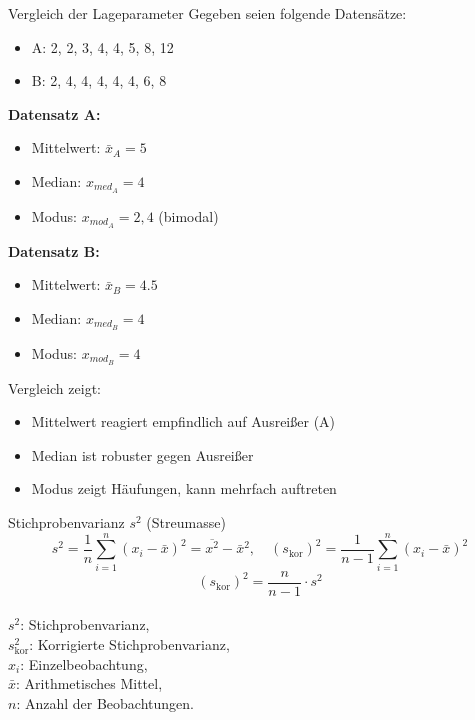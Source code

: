 \begin{example2}{Vergleich der Lageparameter}
Gegeben seien folgende Datensätze:
\begin{itemize}
    \item A: 2, 2, 3, 4, 4, 5, 8, 12
    \item B: 2, 4, 4, 4, 4, 4, 6, 8
\end{itemize}

\textbf{Datensatz A:}
\begin{itemize}
    \item Mittelwert: $\bar{x}_A = 5$
    \item Median: $x_{med_A} = 4$
    \item Modus: $x_{mod_A} = 2, 4$ (bimodal)
\end{itemize}

\textbf{Datensatz B:}
\begin{itemize}
    \item Mittelwert: $\bar{x}_B = 4.5$
    \item Median: $x_{med_B} = 4$
    \item Modus: $x_{mod_B} = 4$
\end{itemize}

Vergleich zeigt:
\begin{itemize}
    \item Mittelwert reagiert empfindlich auf Ausreißer (A)
    \item Median ist robuster gegen Ausreißer
    \item Modus zeigt Häufungen, kann mehrfach auftreten
\end{itemize}
\end{example2}

\begin{definition}{Stichprobenvarianz $s^{2}$ (Streumasse)}\\
$$
s^{2}=\frac{1}{n} \sum_{i=1}^{n}\left(x_{i}-\bar{x}\right)^{2}=\overline{x^{2}}-\bar{x}^{2}, \quad\left(s_{\text{kor}}\right)^{2}=\frac{1}{n-1} \sum_{i=1}^{n}\left(x_{i}-\bar{x}\right)^{2}
$$
$$
\left(s_{\text{kor}}\right)^{2}=\frac{n}{n-1} \cdot s^{2}
$$
\\
$s^{2}$: Stichprobenvarianz, \\
$s_{\text{kor}}^{2}$: Korrigierte Stichprobenvarianz, \\
$x_{i}$: Einzelbeobachtung, \\
$\bar{x}$: Arithmetisches Mittel, \\
$n$: Anzahl der Beobachtungen.
\end{definition}

